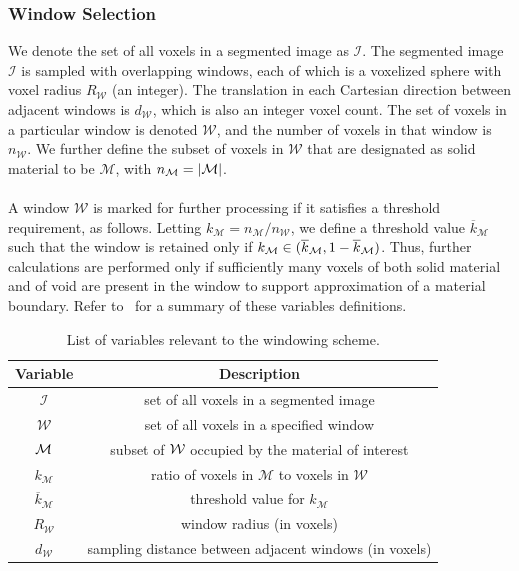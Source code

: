 \subsubsection{Window Selection}

We denote the set of all voxels in a segmented image as $\mathcal{I}$. The segmented image  $\mathcal{I}$ is sampled with overlapping windows, each of which is a voxelized sphere with voxel radius $R_{\mathcal{W}}$ (an integer). The translation in each Cartesian direction between adjacent windows is $d_{\mathcal{W}}$, which is also an integer voxel count. The set of voxels in a particular window is denoted $\mathcal{W}$, and the number of voxels in that window is $n_{\mathcal{W}}$. We further define the subset of voxels in $\mathcal{W}$ that are designated as solid material to be $\mathcal{M}$, with $n_{\mathcal{M}} = | \mathcal{M} |$. \\ \\
%
A window $\mathcal{W}$ is marked for further processing if it satisfies a threshold requirement, as follows.  Letting $k_{\mathcal{M}} = n_{\mathcal{M}}/n_{\mathcal{W}}$, we define a threshold value $\overline{k}_{\mathcal{M}}$ such that the window is retained only if $k_{\mathcal{M}} \in (\overline{k}_{\mathcal{M}}, 1 - \overline{k}_{\mathcal{M}})$.  Thus, further calculations are performed only if sufficiently many voxels of both solid material and of void are present in the window to support approximation of a material boundary. Refer to~ for a summary of these variables definitions.

\begin{table}[htbp!]
 \centering
   \begin{tabular}{|c||c|}
   \hline
   {\textbf{Variable}} & \textbf{Description} \\ \hline \hline
   $\mathcal{I}$ & set of all voxels in a segmented image \\ \hline
   $\mathcal{W}$ & set of all voxels in a specified window \\ \hline
   $\mathcal{M}$ & subset of $\mathcal{W}$ occupied by the material of interest\\ \hline
   {$k_{\mathcal{M}}$} & ratio of voxels in $\mathcal{M}$ to voxels in $\mathcal{W}$\\ \hline
   {$\overline{k}_{\mathcal{M}}$ \rule{0mm}{4mm}} & threshold value for $k_{\mathcal{M}}$ \\ \hline 
   $R_{\mathcal{W}}$ & window radius (in voxels) \\ \hline
   $d_{\mathcal{W}}$ & sampling distance between adjacent windows (in voxels) \\ \hline  
\end{tabular}
\caption{List of variables relevant to the windowing scheme.}
\label{tab:window}
\end{table}

